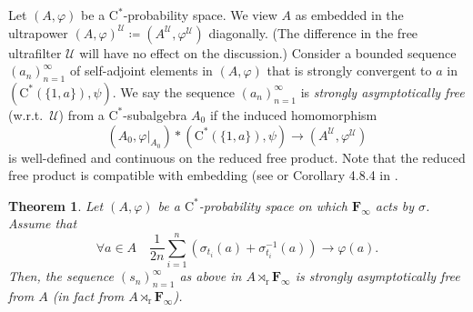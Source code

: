 \documentclass[12pt,nosumlimits,nonamelimits]{amsart}
\newtheorem{thm}{Theorem}
\theoremstyle{remark}
\theoremstyle{definition}
\newcommand{\bF}{\mathbf{F}}
\newcommand{\cU}{\mathcal{U}}
\newcommand{\vp}{\varphi}
\begin{document}
Let $(A,\vp)$ be a $\mathrm{C}^*$-prob\-a\-bility space. 
We view $A$ as embedded in the ultrapower 
$(A,\vp)^\cU \coloneq (A^\cU,\vp^\cU)$ diagonally. 
(The difference in the free ultrafilter $\cU$ will have no effect on the discussion.) 
Consider a bounded sequence $(a_n)_{n=1}^\infty$ of self-adjoint elements 
in $(A,\vp)$ that is strongly convergent to $a$ in $(\mathrm{C}^*(\{1,a\}), \psi)$. 
We say the sequence $(a_n)_{n=1}^\infty$ is \emph{strongly asymptotically free} 
(w.r.t.\ $\cU$) from a $\mathrm{C}^*$-subalgebra $A_0$ if the induced homomorphism 
\[
(A_0,\vp|_{A_0})\ast(\mathrm{C}^*(\{1,a\}),\psi)\to (A^\cU,\vp^\cU)
\]
is well-defined and continuous on the reduced free product. 
Note that the reduced free product is compatible with embedding  (see \cite{bd} or Corollary 4.8.4 in \cite{bo}.

\begin{thm}\label{thm:crossedproduct}
Let $(A,\vp)$ be a $\mathrm{C}^*$-prob\-a\-bility space on 
which $\bF_\infty$ acts by $\sigma$. 
Assume that 
\[
\forall a\in A\quad \frac{1}{2n}\sum_{i=1}^n (\sigma_{t_i}(a)+\sigma_{t_i}^{-1}(a)) \to \vp(a).
\]
Then, the sequence $(s_n)_{n=1}^\infty$ as above in $A\rtimes_\mathrm{r}\bF_\infty$ 
is strongly asymptotically free from $A$ (in fact from $A\rtimes_\mathrm{r}\bF_\infty$).
\end{thm}
\end{document}
